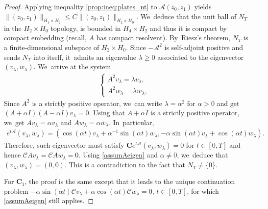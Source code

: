 \documentclass[JEP,XML,SOM,Unicode,published]{cedram}
\theoremstyle{definition}
\let\mc\mathcal
\let\ld\lambda
\newcommand{\A}{\mc{A}}
\newcommand{\bC}{\boldsymbol{C}}
\providecommand{\norm}[1]{\lVert#1\rVert}
\begin{document}
\begin{proof}
Applying inequality \eqref{prop:ineq:plates_nt} to $\A(z_0, z_1)$ yields $\norm{(z_0, z_1)}_{H_4\times H_2}\leq C\norm{(z_0, z_1)}_{H_2\times H_0}$. We~deduce that the unit ball of $N_T$ in the $H_2\times H_0$ topology, is bounded in $H_4\times H_2$ and thus it is compact by compact embedding (recall, $A$ has compact resolvent). By~Riesz's theorem, $N_T$ is a finite-dimensional subspace of $H_2\times H_0$. Since $-\A^2$ is self-adjoint positive and sends $N_T$ into itself, it~admits an eigenvalue $\ld\geq 0$ associated to the eigenvector $(v_\ld, w_\ld)$. We~arrive at the system
\begin{align*}
\left\{\begin{array}{cc}
A^2 v_\ld=\ld v_\ld, & \\[3pt]
A^2w_\ld=\ld w_\ld, &
\end{array}\right.
\end{align*}
Since $A^2$ is a strictly positive operator, we~can write $\lambda=\alpha^2$ for $\alpha> 0$ and get $(A+\alpha I)(A-\alpha I)v_{\lambda}=0$. Using that $A+\alpha I$ is a strictly positive operator, we~get $Av_{\lambda}=\alpha v_{\lambda}$ and $Aw_{\lambda}=\alpha w_{\lambda}$. In~particular,
\begin{align*}
e^{t\A}(v_\ld, w_\ld)=(\cos(\alpha t)v_\ld+\alpha^{-1}\sin (\alpha t) w_\ld,-\alpha\sin(\alpha t)v_\ld+\cos (\alpha t) w_\ld).
\end{align*}
Therefore, such eigenvector must satisfy $\bC e^{t\A}(v_\ld, w_\ld)=0$ for $t\in [0,T]$ and hence $\mc{C}A v_\ld=\mc{C}A w_\ld=0$. Using \cref{assumAeigen} and $\alpha\neq 0$, we~deduce that $(v_\ld,w_{\ld})=(0,0)$. This is a contradiction to the fact that $N_T\neq \{0\}$.

For $\bC_1$, the proof is the same except that it leads to the unique continuation problem $-\alpha\sin(\alpha t)\mc{C}v_\ld+\alpha \cos (\alpha t) \mc{C}w_\ld=0$, $t\in [0,T]$, for which \cref{assumAeigen} still applies.
\end{proof}
\end{document}
